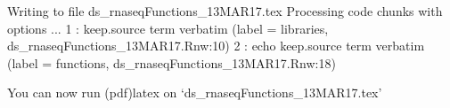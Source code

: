 \documentclass[a4paper]{article}
\begin{document}
\title{}
\author{}

\maketitle

\begin{Schunk}
\begin{Soutput}
Writing to file ds_rnaseqFunctions_13MAR17.tex
Processing code chunks with options ...
 1 : keep.source term verbatim (label = libraries, ds_rnaseqFunctions_13MAR17.Rnw:10)
 2 : echo keep.source term verbatim (label = functions, ds_rnaseqFunctions_13MAR17.Rnw:18)

You can now run (pdf)latex on ‘ds_rnaseqFunctions_13MAR17.tex’
\end{Soutput}
\end{Schunk}

\end{document}
